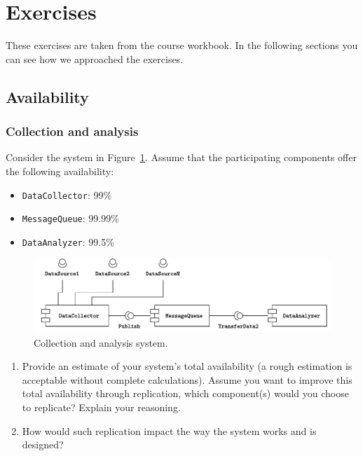 \section{Exercises}

These exercises are taken from the course workbook\cite{exerciseBook}. In the following sections you can see how we approached the exercises.

\subsection{Availability}

\subsubsection{Collection and analysis}

\descriptionproblem
Consider the system in Figure~\ref{fig: exercises - collection and analysis system}. Assume that the participating components offer the following availability:
\begin{itemize}
    \item \texttt{DataCollector}: 99\%
    \item \texttt{MessageQueue}: 99.99\%
    \item \texttt{DataAnalyzer}: 99.5\%
\end{itemize}

\begin{figure}[!htp]
    \centering
    \includegraphics[width=\textwidth]{img/collection-and-analysis-1.pdf}
    \caption{Collection and analysis system.}
    \label{fig: exercises - collection and analysis system}
\end{figure}

\questionproblem
\begin{enumerate}
    \item Provide an estimate of your system's total availability (a rough estimation is acceptable without complete calculations). Assume you want to improve this total availability through replication, which component(s) would you choose to replicate? Explain your reasoning.
    
    \item How would such replication impact the way the system works and is designed?
\end{enumerate}

